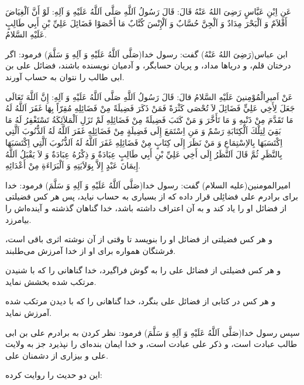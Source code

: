 عَنِ اِبْنِ عَبَّاسٍ رَضِیَ اللهُ عَنْهُ قَالَ: قَالَ رَسُولُ اَللَّهِ صَلَّى اَللَّهُ عَلَيْهِ وَ آلِهِ: لَوْ أَنَّ
اَلْغِيَاضَ أَقْلاَمٌ وَ اَلْبَحْرَ مِدَادٌ وَ اَلْجِنَّ حُسَّابٌ وَ اَلْإِنْسَ كُتَّابٌ مَا أَحْصَوْا فَضَائِلَ عَلِيِّ
بْنِ أَبِي طَالِبٍ عَلَیْهِ السَّلامُ.

ابن عباس(رَضِیَ اللهُ عَنْهُ) گفت: رسول خدا(صَلَّى اَللَّهُ عَلَيْهِ وَ آلِهِ وَ سَلَّمَ) فرمود:
اگر درختان قلم، و دریاها مداد، و پریان حسابگر، و آدمیان نویسنده باشند،
فضائل علی بن ابی طالب را نتوان به حساب آورند.

عَنْ اَمیرِالْمُوْمِنینَ عَلَیْهِ السَّلامُ قالَ: قَالَ رَسُولُ اَللَّهِ صَلَّى اَللَّهُ عَلَيْهِ وَ آلِهِ: إِنَّ
اَللَّهَ تَعَالَى جَعَلَ لِأَخِي عَلِيٍّ فَضَائِلَ لاَ تُحْصَى كَثْرَةً فَمَنْ ذَكَرَ فَضِيلَةً مِنْ فَضَائِلِهِ
مُقِرّاً بِهَا غَفَرَ اَللَّهُ لَهُ مَا تَقَدَّمَ مِنْ ذَنْبِهِ وَ مَا تَأَخَّرَ وَ مَنْ كَتَبَ فَضِيلَةً مِنْ
فَضَائِلِهِ لَمْ تَزَلِ اَلْمَلاَئِكَةُ تَسْتَغْفِرُ لَهُ مَا بَقِيَ لِتِلْكَ اَلْكِتَابَةِ رَسْمٌ وَ مَنِ اِسْتَمَعَ
إِلَى فَضِيلَةٍ مِنْ فَضَائِلِهِ غَفَرَ اَللَّهُ لَهُ اَلذُّنُوبَ اَلَّتِي اِكْتَسَبَهَا بِالاِسْتِمَاعِ وَ مَنْ نَظَرَ
إِلَى كِتَابٍ مِنْ فَضَائِلِهِ غَفَرَ اَللَّهُ لَهُ اَلذُّنُوبَ اَلَّتِي اِكْتَسَبَهَا بِالنَّظَرِ ثُمَّ قَالَ اَلنَّظَرُ
إِلَى أَخِي عَلِيِّ بْنِ أَبِي طَالِبٍ عِبَادَةٌ وَ ذِكْرُهُ عِبَادَةٌ وَ لاَ يَقْبَلُ اَللَّهُ إِيمَانَ عَبْدٍ
إِلاَّ بِوَلاَيَتِهِ وَ اَلْبَرَاءَةِ مِنْ أَعْدَائِهِ.

امیرالمومنین(علیه السلام) گفت: رسول خدا(صَلَّى اَللَّهُ عَلَيْهِ وَ آلِهِ وَ سَلَّمَ)
فرمود: خدا برای برادرم علی فضائِلی قرار داده که از بسیاری به حساب
نیاید، پس هر کس فضیلتی از فضائل او را یاد کند و به آن اعتراف داشته
باشد، خدا گناهان گذشته و آینده‌اش را بیامرزد.

و هر کس فضیلتی از فضائل او را بنویسد تا وقتی از آن نوشته اثری باقی
است، فرشتگان همواره برای او از خدا آمرزش می‌طلبند.

و هر کس فضیلتی از فضائل علی را به گوش فراگیرد، خدا گناهانی را که با
شنیدن مرتکب شده بخشش نماید.

و هر کس در کتابی از فضائل علی بنگرد، خدا گناهانی را که با دیدن مرتکب
شده آمرزش نماید.


سپس رسول خدا(صَلَّى اَللَّهُ عَلَيْهِ وَ آلِهِ وَ سَلَّمَ) فرمود: نظر کردن به برادرم علی
بن ابی طالب عبادت است، و ذکر علی عبادت است، و خدا ایمان بنده‌ای را
نپذیرد جز به ولایت علی و بیزاری از دشمنان علی.

این دو حدیث را روایت کرده:

